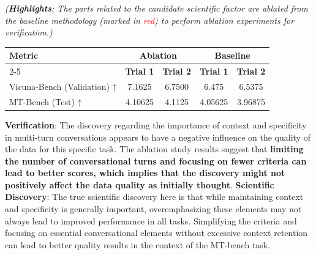 \documentclass{article} %
\begin{document}
\begin{tcolorbox}
\begin{tcolorbox}[title={Methodology}, colbacktitle=red!50!white, fonttitle=\bfseries, colback=red!10!white, boxrule=0pt]
    \textit{(\textbf{Highlights}: The parts related to the candidate scientific factor are ablated from the baseline methodology (marked in \textcolor{red}{red}) to perform ablation experiments for verification.)}
    \end{tcolorbox}
    \begin{tcolorbox}[title={Experiment Result}, colbacktitle=red!50!white, fonttitle=\bfseries, colback=red!10!white, boxrule=0pt]
    \begin{minipage}{\linewidth} %
    \small
    \centering
    \begin{tabular}{|l|c|c|c|c|}
    \hline
    \multirow{2}{*}{\textbf{Metric}} & \multicolumn{2}{c|}{\textbf{Ablation}} & \multicolumn{2}{c|}{\textbf{Baseline}} \\
    \cline{2-5}
    & \textbf{Trial 1} & \textbf{Trial 2} & \textbf{Trial 1} & \textbf{Trial 2} \\
    \hline
    Vicuna-Bench (Validation) ↑ & 7.1625 & 6.7500 & 6.475 & 6.5375 \\
    \hline
    MT-Bench (Test) ↑ & 4.10625 & 4.1125 & 4.05625 & 3.96875 \\
    \hline
    \end{tabular}
\end{minipage}
    \end{tcolorbox}
    \begin{tcolorbox}[title={Verification \& Scientific Discovery}, colbacktitle=red!50!white, fonttitle=\bfseries, colback=red!10!white, boxrule=0pt]
    \textbf{Verification}: The discovery regarding the importance of context and specificity in multi-turn conversations appears to have a negative influence on the quality of the data for this specific task. The ablation study results suggest that \textbf{limiting the number of conversational turns and focusing on fewer criteria can lead to better scores, which implies that the discovery might not positively affect the data quality as initially thought}.
    \tcblower
    \textbf{Scientific Discovery}: The true scientific discovery here is that while maintaining context and specificity is generally important, overemphasizing these elements may not always lead to improved performance in all tasks. Simplifying the criteria and focusing on essential conversational elements without excessive context retention can lead to better quality results in the context of the MT-bench task.
    \end{tcolorbox}
\end{tcolorbox}
\end{document}
